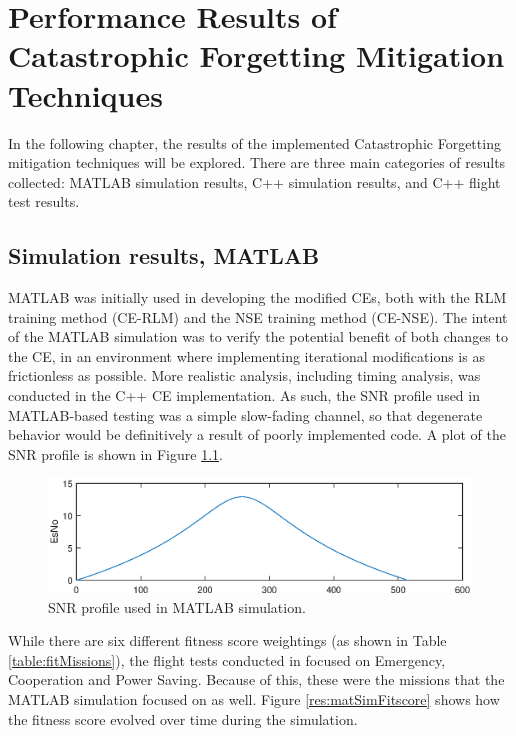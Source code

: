 \chapter{Performance Results of Catastrophic Forgetting Mitigation Techniques}\label{ch:results}

\par In the following chapter, the results of the implemented Catastrophic Forgetting mitigation techniques will be explored. There are three main categories of results collected: MATLAB simulation results, C++ simulation results, and C++ flight test results. %
\section{Simulation results, MATLAB}
\par MATLAB was initially used in developing the modified CEs, both with the RLM training method (CE-RLM) and the NSE training method (CE-NSE). The intent of the MATLAB simulation was to verify the potential benefit of both changes to the CE, in an environment where implementing iterational modifications is as frictionless as possible. More realistic analysis, including timing analysis, was conducted in the C++ CE implementation. As such, the SNR profile used in MATLAB-based testing was a simple slow-fading channel, so that degenerate behavior would be definitively a result of poorly implemented code. A plot of the SNR profile is shown in Figure \ref{fig:matlabSNRProf}. 
\begin{figure}[ht]
\centering
\includegraphics[width=\linewidth]{figures/matlab_sim_results/snrPRofile_matlabsim.eps}
\caption{SNR profile used in MATLAB simulation.}
\label{fig:matlabSNRProf}
\end{figure}
\par While there are six different fitness score weightings (as shown in Table \ref{table:fitMissions}), the flight tests conducted in \cite{tim_implementation_paper} focused on Emergency, Cooperation and Power Saving. Because of this, these were the missions that the MATLAB simulation focused on as well. Figure \ref{res:matSimFitscore} shows how the fitness score evolved over time during the simulation.

